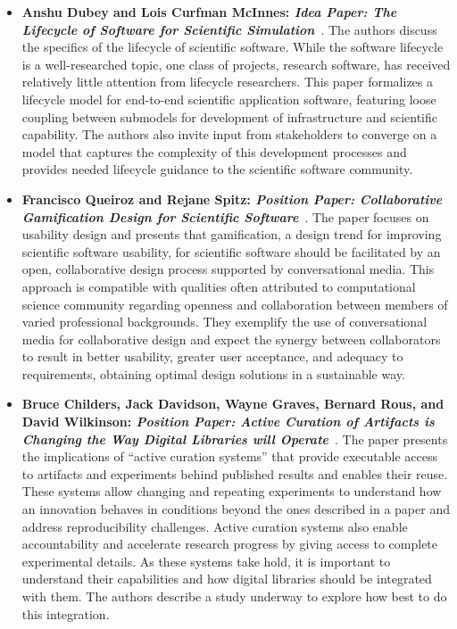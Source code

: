 \documentclass[11pt, oneside]{amsart}
\begin{document}
\begin{itemize}
\item \textbf{Anshu Dubey and Lois Curfman McInnes: \emph{Idea Paper: The Lifecycle
of Software for Scientific Simulation}}~\cite{Dubey2:2016ws}.
The authors discuss the specifics of the lifecycle of scientific software.
While the software lifecycle is a well-researched topic, one class of projects,
research software, has received relatively
little attention from lifecycle researchers. This
paper formalizes a lifecycle model
for end-to-end scientific application software, featuring loose
coupling between submodels for development of infrastructure
and scientific capability. The authors also invite input from stakeholders
to converge on a model that captures the complexity of this
development processes and provides needed lifecycle guidance to
the scientific software community.

\item \textbf{Francisco Queiroz and Rejane Spitz: \emph{Position Paper:
Collaborative Gamification Design for Scientific Software}}~\cite{Queiroz:2016ws}.
The paper focuses on usability design and presents that gamification, a design
trend for improving scientific software usability, for scientific software should
be facilitated by an open, collaborative design process supported by
conversational media. This approach is compatible with
qualities often attributed to computational science community
regarding openness and collaboration between members of varied
professional backgrounds. They exemplify the use of conversational media for
collaborative design and expect the synergy between collaborators to result in
better usability, greater user acceptance, and adequacy to requirements,
obtaining optimal design solutions in a sustainable way.

\item \textbf{Bruce Childers, Jack Davidson, Wayne Graves, Bernard Rous, and
David Wilkinson: \emph{Position Paper: Active Curation of Artifacts is Changing
the Way Digital Libraries will Operate}}~\cite{Childers:2016ws}.
The paper presents the implications of ``active curation systems'' that provide
executable access to
artifacts and experiments behind published results and enables
their reuse. These systems allow changing and repeating experiments to understand
how an innovation behaves in conditions beyond the ones described in a paper and
address reproducibility challenges. Active curation systems
also  enable accountability and accelerate research progress  by
giving access to complete experimental details. As these systems
take  hold,  it  is  important  to  understand  their  capabilities  and
how digital libraries should be integrated with them. The authors describe a
study underway to explore how best
to do this integration.


\end{itemize}
\end{document}
